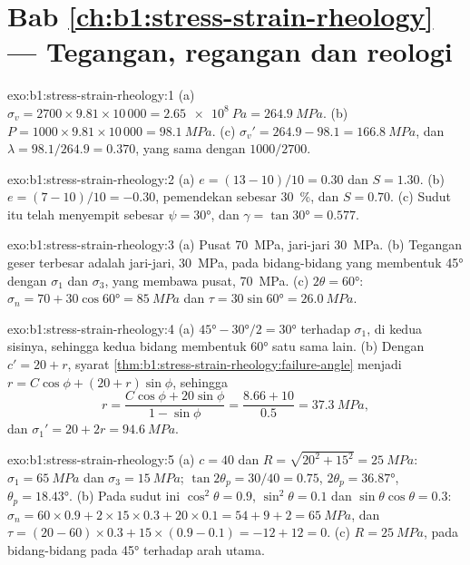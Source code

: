 \section*{Bab \ref{ch:b1:stress-strain-rheology} --- Tegangan, regangan dan reologi}

\begin{solution}{exo:b1:stress-strain-rheology:1}
(a) $\sigma_v = 2700\times9.81\times10\,000 = \qty{2.65e8}{Pa} = \qty{264.9}{MPa}$.
(b) $P = 1000\times9.81\times10\,000 = \qty{98.1}{MPa}$. (c) $\sigma_v' =
264.9 - 98.1 = \qty{166.8}{MPa}$, dan $\lambda = 98.1/264.9 = 0.370$, yang sama dengan
$1000/2700$.
\end{solution}

\begin{solution}{exo:b1:stress-strain-rheology:2}
(a) $e = (13-10)/10 = 0.30$ dan $S = 1.30$. (b) $e = (7-10)/10 = -0.30$, pemendekan
sebesar \qty{30}{\percent}, dan $S = 0.70$. (c) Sudut itu telah menyempit sebesar $\psi = \ang{30}$, dan $\gamma = \tan\ang{30} = 0.577$.
\end{solution}

\begin{solution}{exo:b1:stress-strain-rheology:3}
(a) Pusat \qty{70}{MPa}, jari-jari \qty{30}{MPa}. (b) Tegangan geser terbesar adalah jari-jari,
\qty{30}{MPa}, pada bidang-bidang yang membentuk \ang{45} dengan $\sigma_1$ dan $\sigma_3$, yang
membawa  pusat, \qty{70}{MPa}. (c)
$2\theta = \ang{60}$: $\sigma_n = 70 + 30\cos\ang{60} = \qty{85}{MPa}$ dan
$\tau = 30\sin\ang{60} = \qty{26.0}{MPa}$.
\end{solution}

\begin{solution}{exo:b1:stress-strain-rheology:4}
(a) $\ang{45} - \ang{30}/2 = \ang{30}$ terhadap $\sigma_1$, di kedua sisinya, sehingga kedua bidang
membentuk \ang{60} satu sama lain. (b) Dengan $c' = 20 + r$, syarat
\cref{thm:b1:stress-strain-rheology:failure-angle} menjadi
$r = C\cos\phi + (20 + r)\sin\phi$, sehingga
\[
  r = \frac{C\cos\phi + 20\sin\phi}{1 - \sin\phi} = \frac{8.66 + 10}{0.5}
    = \qty{37.3}{MPa},
\]
dan $\sigma_1' = 20 + 2r = \qty{94.6}{MPa}$.
\end{solution}

\begin{solution}{exo:b1:stress-strain-rheology:5}
(a) $c = 40$ dan $R = \sqrt{20^2 + 15^2} = \qty{25}{MPa}$: $\sigma_1 =
\qty{65}{MPa}$ dan $\sigma_3 = \qty{15}{MPa}$; $\tan2\theta_p = 30/40 = 0.75$,
$2\theta_p = \ang{36.87}$, $\theta_p = \ang{18.43}$. (b) Pada sudut ini
$\cos^2\theta = 0.9$, $\sin^2\theta = 0.1$ dan $\sin\theta\cos\theta = 0.3$:
$\sigma_n = 60\times0.9 + 2\times15\times0.3 + 20\times0.1 = 54 + 9 + 2 =
\qty{65}{MPa}$, dan $\tau = (20-60)\times0.3 + 15\times(0.9-0.1) = -12 + 12 =
0$. (c) $R = \qty{25}{MPa}$, pada bidang-bidang pada \ang{45} terhadap arah utama.
\end{solution}

